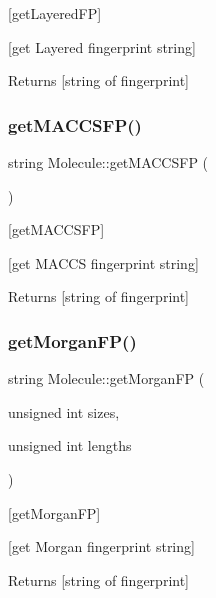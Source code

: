 \mbox{[}get\+Layered\+FP\mbox{]} 

\mbox{[}get Layered fingerprint string\mbox{]}

\begin{DoxyReturn}{Returns}
\mbox{[}string of fingerprint\mbox{]} 
\end{DoxyReturn}
\mbox{\label{class_molecule_ab883bbe83bb687a47fe8259dab882db1}} 
\subsubsection{\texorpdfstring{get\+M\+A\+C\+C\+S\+F\+P()}{getMACCSFP()}}
{\footnotesize\ttfamily string Molecule\+::get\+M\+A\+C\+C\+S\+FP (\begin{DoxyParamCaption}{ }\end{DoxyParamCaption})}



\mbox{[}get\+M\+A\+C\+C\+S\+FP\mbox{]} 

\mbox{[}get M\+A\+C\+CS fingerprint string\mbox{]}

\begin{DoxyReturn}{Returns}
\mbox{[}string of fingerprint\mbox{]} 
\end{DoxyReturn}
\mbox{\label{class_molecule_a79d09ea8b999fe6ee10efbbdbee2dc54}} 
\subsubsection{\texorpdfstring{get\+Morgan\+F\+P()}{getMorganFP()}}
{\footnotesize\ttfamily string Molecule\+::get\+Morgan\+FP (\begin{DoxyParamCaption}\item[{unsigned int}]{sizes,  }\item[{unsigned int}]{lengths }\end{DoxyParamCaption})}



\mbox{[}get\+Morgan\+FP\mbox{]} 

\mbox{[}get Morgan fingerprint string\mbox{]}

\begin{DoxyReturn}{Returns}
\mbox{[}string of fingerprint\mbox{]} 
\end{DoxyReturn}
\mbox{\label{class_molecule_aa769820db6167c0861d1a784ba64ebbc}} 
